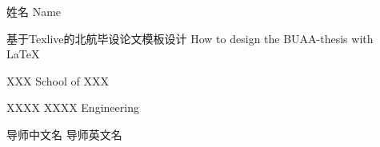 
\thesisauthor
{姓名}
{Name}

\thesistitle
{基于Texlive的北航毕设论文模板设计}
{How to design the BUAA-thesis with \LaTeX{}}

\school
{XXX}
{School of XXX}

\major
{XXXX}
{XXXX Engineering}

\teacher
{导师中文名}
{导师英文名}






